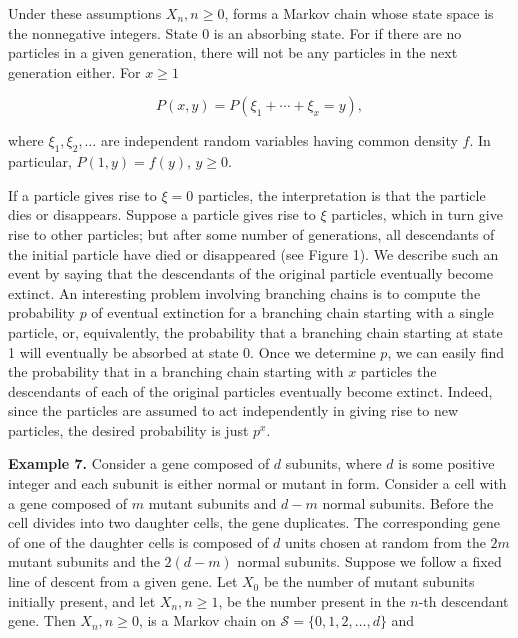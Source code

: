 \documentclass[12pt,openany]{book}
\theoremstyle{definition}
\begin{document}
	Under these assumptions \(X_n, n \geq 0\), forms a Markov chain whose state space is the nonnegative integers. State 0 is an absorbing state. For if there are no particles in a given generation, there will not be any particles in the next generation either. For \(x \geq 1\)
	
	\[ P(x, y) = P(\xi_1+\cdots+\xi_x=y), \]
	
	where \(\xi_1, \xi_2, \ldots\) are independent random variables having common density \(f\). In particular, \(P(1, y) = f(y)\), \(y \geq 0\).
	
	
	If a particle gives rise to \( \xi = 0 \) particles, the interpretation is that the particle dies or disappears. Suppose a particle gives rise to \( \xi \) particles, which in turn give rise to other particles; but after some number of generations, all descendants of the initial particle have died or disappeared (see Figure 1). We describe such an event by saying that the descendants of the original particle eventually become extinct. An interesting problem involving branching chains is to compute the probability \( p \) of eventual extinction for a branching chain starting with a single particle, or, equivalently, the probability that a branching chain starting at state 1 will eventually be absorbed at state 0. Once we determine \( p \), we can easily find the probability that in a branching chain starting with \( x \) particles the descendants of each of the original particles eventually become extinct. Indeed, since the particles are assumed to act independently in giving rise to new particles, the desired probability is just \( p^x \).
	
	\textbf{Example 7.} Consider a gene composed of \( d \) subunits, where \( d \) is some positive integer and each subunit is either normal or mutant in form. Consider a cell with a gene composed of \( m \) mutant subunits and \( d - m \) normal subunits. Before the cell divides into two daughter cells, the gene duplicates. The corresponding gene of one of the daughter cells is composed of \( d \) units chosen at random from the \( 2m \) mutant subunits and the \( 2(d - m) \) normal subunits. Suppose we follow a fixed line of descent from a given gene. Let \( X_0 \) be the number of mutant subunits initially present, and let \( X_n, n \geq 1 \), be the number present in the \( n \)-th descendant gene. Then \( X_n, n \geq 0 \), is a Markov chain on \( \mathcal{S} = \{0, 1, 2, \ldots, d\} \) and
	
\end{document}
